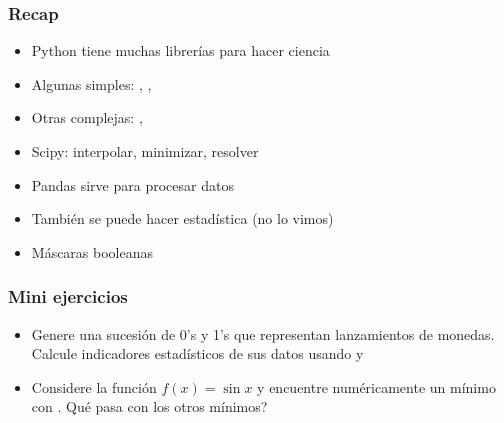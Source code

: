 \documentclass[14pt,aspectratio=169,xcolor=dvipsnames]{beamer}
\begin{document}
\begin{frame}\frametitle{Recap}
    \begin{itemize}
        \item Python tiene muchas librerías para hacer ciencia
        \item Algunas simples: , , 
        \item Otras complejas: , 
        \item Scipy: interpolar, minimizar, resolver
        \item Pandas sirve para procesar datos
        \item También se puede hacer estadística (no lo vimos)
        \item Máscaras booleanas
    \end{itemize}

    \pause
    \vspace{1cm}
\end{frame}
\begin{frame}
    \maketitle
\end{frame}
\begin{frame}\frametitle{Mini ejercicios}
    \begin{itemize}
    \item Genere una sucesión de 0's y 1's que representan lanzamientos de monedas. Calcule indicadores estadísticos de sus datos usando  y 
    \item Considere la función $f(x)=\sin x$ y encuentre numéricamente un mínimo con . Qué pasa con los otros mínimos? 
    \end{itemize}
\end{frame}
\end{document}
